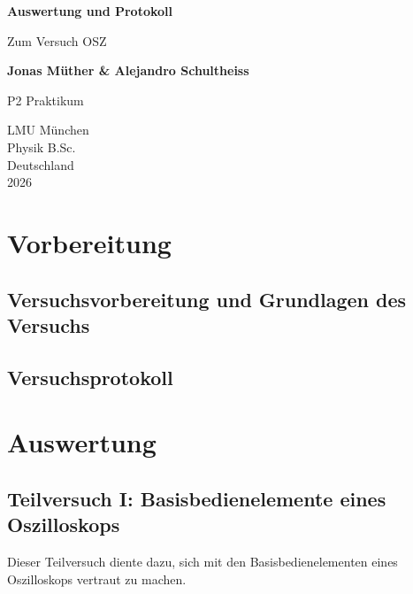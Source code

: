 \documentclass{report}
\begin{document}

\begin{titlepage}
    \begin{center}
        \vspace*{1cm}
            
        \Huge
        \textbf{Auswertung und Protokoll}
            
        \vspace{0.5cm}
        \LARGE
        Zum Versuch OSZ
        
        \vspace{1.8cm}

        \textbf{Jonas Müther \& Alejandro Schultheiss}
        \vfill
            
        P2 Praktikum\\
       
            
        \vspace{0.8cm}
  

        \vspace{1.8cm}
        \Large
        LMU München \\
        Physik B.Sc.\\
        Deutschland\\
        2026
            
    \end{center}
\end{titlepage}
\tableofcontents

\newpage
\chapter{Vorbereitung}

\section{Versuchsvorbereitung und Grundlagen des Versuchs}


\section{Versuchsprotokoll}


\newpage
\chapter{Auswertung}
\section{Teilversuch I: Basisbedienelemente eines Oszilloskops}
Dieser Teilversuch diente dazu, sich mit den Basisbedienelementen eines Oszilloskops vertraut zu machen.
\end{document}
